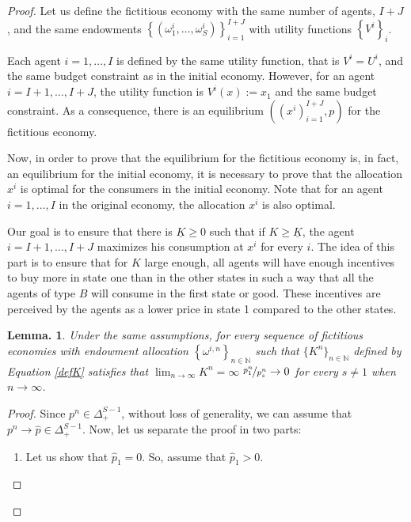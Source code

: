 \documentclass[pdftex]{article}
\numberwithin{equation}{section}
\theoremstyle{th}
\newtheorem{lemma}{{Lemma}.}%
\newtheorem{proof lemma}{{Proof Lemma}.}
\theoremstyle{definition}
\begin{document}
{\begin{proof}
Let us define the fictitious economy with the same number of agents,
$I+J$, and the same endowments $\left\{ \left(\omega_{1}^{i},\dots,\omega_{S}^{i}\right)\right\} _{i=1}^{I+J}$
with utility functions $\left\{ V^{i}\right\} _{i}$.

Each agent $i=1,\dots,I$ is defined by the same utility function,
that is $V^{i}=U^{i}$, and the same budget constraint as in the initial
economy. However, for an agent $i=I+1,\dots,I+J$, the utility function
is $V^{i}(x):=x_{1}$ and the same budget constraint. As a consequence, there is an equilibrium
$\left(\left(x^{i}\right)_{i=1}^{I+J},p\right)$ for the fictitious
economy. 

Now, in order to prove that the equilibrium for the fictitious economy
is, in fact, an equilibrium for the initial economy, it is necessary
to prove that the allocation $x^{i}$ is optimal for the consumers
in the initial economy. Note that for an agent $i=1,\dots,I$ in
the original economy, the allocation $x^{i}$ is also optimal.

Our goal is to ensure that there is $\underline{K}\geq0$ such that
if $K\geq\underline{K}$, the agent $i=I+1,\dots,I+J$ maximizes his
consumption at $x^{i}$ for every $i$. The idea of this part is
to ensure that for $K$ large enough, all agents will have enough
incentives to buy more in state one than in the other states in such
a way that all the agents of type $B$ will consume in the first state
or good. These incentives are perceived by the agents as a lower price
in state 1 compared to the other states. 

\begin{lemma} \label{lemma1} Under the same assumptions, for every sequence of fictitious economies with endowment allocation $\left\{\omega^{i,n}\right\}_{n\in\mathbb{N}}$ such that $\{K^n\}_{n\in\mathbb{N}}$ defined by Equation \ref{defK} satisfies that $\lim_{n\rightarrow\infty}K^n=\infty$ $\nicefrac{p_{1}^{n}}{p_s^n}\rightarrow0$ for every $s\neq1$ when $n\rightarrow\infty$. \end{lemma}

\begin{proof}Since $p^{n}\in\Delta_{+}^{S-1}$, without loss of generality, we can assume that $p^{n}\rightarrow\hat{p}\in\Delta_{+}^{S-1}$. Now, let us separate
the proof in two parts: 
\begin{enumerate}
\item Let us show that $\hat{p}_{1}=0$. So, assume that $\hat{p}_{1}>0$.


\end{enumerate}
\end{proof}
\end{proof}}
\end{document}
